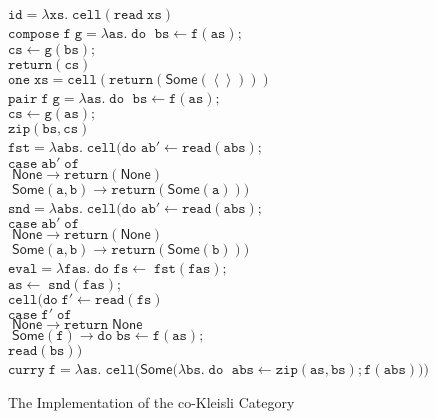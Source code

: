 \documentclass[nocopyrightspace,preprint]{sigplanconf}
\newcommand{\term}[1]{\ensuremath{\mathtt{{#1}}}}
\newcommand{\unitval}{\left<\right>}
\newcommand{\None}{\mathsf{None}}
\newcommand{\Some}[1]{\mathsf{Some}({#1})}
\begin{document}
\begin{figure}
{\small
\begin{tabbing}
\term{id = \lambda xs.\;cell(read\;xs)} 
\\[0.5em]

\term{compose\;f\;g =\lambda as.\; do\;}
 \=\term{bs \leftarrow f(as);} \\
 \>\term{cs \leftarrow g(bs);} \\
 \>\term{return(cs)} 
\\[0.5em]

\term{one\;xs = cell(return(\Some{\unitval}))}
\\[0.5em]

\term{pair\;f\;g = \lambda as.\;do\;}
  \=\term{bs \leftarrow f(as);} \\
  \>\term{cs \leftarrow g(as);} \\
  \>\term{zip(bs,cs)}
\\[0.5em]

\term{fst = \lambda abs.\;cell(do}
  \= \term{ab' \leftarrow read(abs);} \\
  \>\term{case \; ab'\; of} \\
  \>\term{\;\None \to return(\None)} \\
  \>\term{\;\Some{a,b} \to return(\Some{a}))} 
\\[0.5em]


\term{snd = \lambda abs.\;cell(do}
  \= \term{ab' \leftarrow read(abs);} \\
  \>\term{case \; ab'\; of} \\
  \>\term{\;\None \to return(\None)} \\
  \>\term{\;\Some{a,b} \to return(\Some{b}))} 
\\[0.5em]

\term{eval = \lambda fas.\;do}\;
              \=\term{fs \leftarrow \;fst(fas);}\\
              \>\term{as \leftarrow \;snd(fas);}\\
              \>\term{cell(do\;}\=\term{f' \leftarrow read(fs)}\\
              \>                  \>\term{case\;f'\;of}\\
              \>                  \>\term{\;\None \to return\;\None} \\
              \>                  \>\term{\;\Some{f} \to do\;}\=\term{bs \leftarrow f(as);} \\
              \>                  \>                            \>$\term{read(bs)})$ 
\\[0.5em]

\term{curry\;f =\lambda as.\;cell(\mathsf{Some}(\lambda bs.\;do\;}
  \=\term{abs \leftarrow zip(as,bs); f(abs)))}
\end{tabbing}
}
\caption{The Implementation of the co-Kleisli Category}
\label{cokleisli-implementation}
\end{figure}
\end{document}
